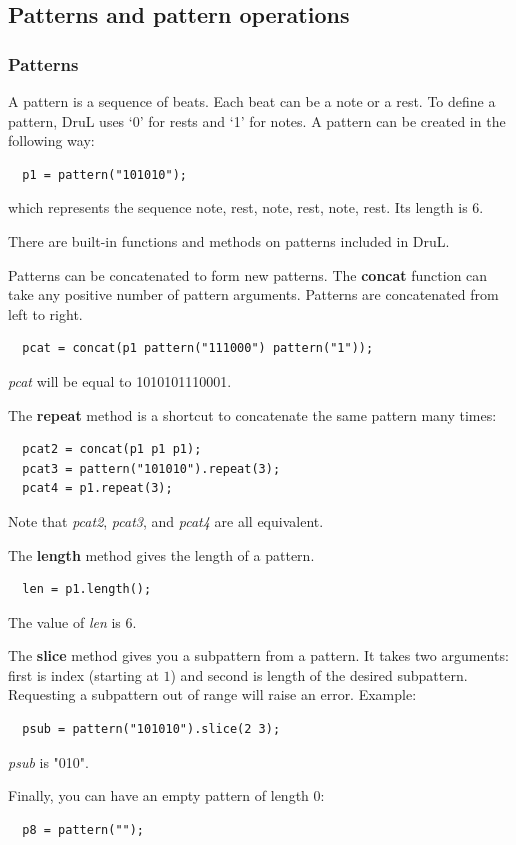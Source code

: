 \subsection{Patterns and pattern operations}

\subsubsection{Patterns}

A pattern is a sequence of beats.  Each beat can be a note or a rest.
To define a pattern, DruL uses `0' for rests and `1' for notes.
A pattern can be created in the following way:
\begin{verbatim}
  p1 = pattern("101010");
\end{verbatim}
which represents the sequence {note, rest, note, rest, note, rest}.
Its length is $6$.

There are built-in functions and methods on patterns included in DruL.

Patterns can be concatenated to form new patterns.  The \textbf{concat} function can take any positive number of pattern arguments.  Patterns are concatenated from left to right.
\begin{verbatim}
  pcat = concat(p1 pattern("111000") pattern("1"));
\end{verbatim}
\textit{pcat} will be equal to 1010101110001.

The \textbf{repeat} method is a shortcut to concatenate the same pattern many times:
\begin{verbatim}
  pcat2 = concat(p1 p1 p1);
  pcat3 = pattern("101010").repeat(3);
  pcat4 = p1.repeat(3);
\end{verbatim}
Note that \textit{pcat2}, \textit{pcat3}, and \textit{pcat4} are all equivalent.

The \textbf{length} method gives the length of a pattern.
\begin{verbatim}
  len = p1.length();
\end{verbatim}
The value of \textit{len} is $6$.

The \textbf{slice} method gives you a subpattern from a pattern.
It takes two arguments: first is index (starting at $1$) and second is
length of the desired subpattern. Requesting a subpattern out of range will
raise an error. Example:
\begin{verbatim}
  psub = pattern("101010").slice(2 3);
\end{verbatim}
\textit{psub} is "010".


Finally, you can have an empty pattern of length $0$:
\begin{verbatim}
  p8 = pattern("");
\end{verbatim}



